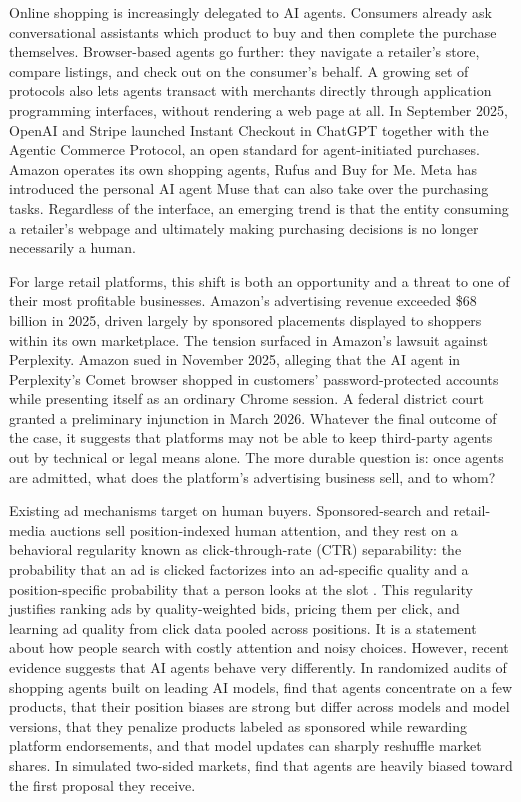 \documentclass[opre,dblanonrev]{informs4}
\providecommand{\1}{\mathbf{1}}
\begin{document}
Online shopping is increasingly delegated to AI agents. Consumers already ask conversational assistants which product to buy and then complete the purchase themselves. Browser-based agents go further: they navigate a retailer's store, compare listings, and check out on the consumer's behalf. A growing set of protocols also lets agents transact with merchants directly through application programming interfaces, without rendering a web page at all. In September 2025, OpenAI and Stripe launched Instant Checkout in ChatGPT together with the Agentic Commerce Protocol, an open standard for agent-initiated purchases. Amazon operates its own shopping agents, Rufus and Buy for Me. Meta has introduced the personal AI agent Muse that can also take over the purchasing tasks. Regardless of the interface, an emerging trend is that the entity consuming a retailer’s webpage and ultimately making purchasing decisions is no longer necessarily a human.

For large retail platforms, this shift is both an opportunity and a threat to one of their most profitable businesses. Amazon's advertising revenue exceeded \$68 billion in 2025, driven largely by sponsored placements displayed to shoppers within its own marketplace. The tension surfaced in Amazon's lawsuit against Perplexity. Amazon sued in November 2025, alleging that the AI agent in Perplexity's Comet browser shopped in customers' password-protected accounts while presenting itself as an ordinary Chrome session. A federal district court granted a preliminary injunction in March 2026. Whatever the final outcome of the case, it suggests that platforms may not be able to keep third-party agents out by technical or legal means alone. The more durable question is: once agents are admitted, what does the platform's advertising business sell, and to whom?

Existing ad mechanisms target on human buyers. Sponsored-search and retail-media auctions sell position-indexed human attention, and they rest on a behavioral regularity known as click-through-rate (CTR) separability: the probability that an ad is clicked factorizes into an ad-specific quality and a position-specific probability that a person looks at the slot \citep{edelman2007internet,varian2007position,athey2011position}. This regularity justifies ranking ads by quality-weighted bids, pricing them per click, and learning ad quality from click data pooled across positions. It is a statement about how people search with costly attention and noisy choices. However, recent evidence suggests that AI agents behave very differently. In randomized audits of shopping agents built on leading AI models, \citet{allouah2026your} find that agents concentrate on a few products, that their position biases are strong but differ across models and model versions, that they penalize products labeled as sponsored while rewarding platform endorsements, and that model updates can sharply reshuffle market shares. In simulated two-sided markets, \citet{bansal2025magentic} find that agents are heavily biased toward the first proposal they receive.
\end{document}
